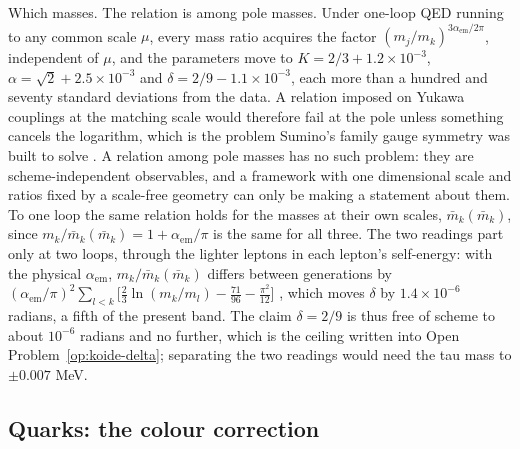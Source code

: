 Which masses. The relation is among pole masses. Under one-loop QED running to any common scale
$\mu$, every mass ratio acquires the factor $(m_j/m_k)^{3\alpha_{\mathrm{em}}/2\pi}$,
independent of $\mu$, and the parameters move to $K = 2/3 + 1.2\times10^{-3}$, $\alpha = \sqrt2
+ 2.5\times10^{-3}$ and $\delta = 2/9 - 1.1\times10^{-3}$, each more than a hundred and seventy
standard deviations from the data. A relation imposed on Yukawa couplings at the matching scale
would therefore fail at the pole unless something cancels the logarithm, which is the problem
Sumino's family gauge symmetry was built to solve \autocite{sumino2009family,sumino2009origin}.
A relation among pole masses has no such problem: they are scheme-independent observables, and a
framework with one dimensional scale and ratios fixed by a scale-free geometry can only be
making a statement about them. To one loop the same relation holds for the masses at their own
scales, $\bar m_k(\bar m_k)$, since $m_k/\bar m_k(\bar m_k) = 1 + \alpha_{\mathrm{em}}/\pi$ is
the same for all three. The two readings part only at two loops, through the lighter leptons in
each lepton's self-energy: with the physical $\alpha_{\mathrm{em}}$, $m_k/\bar m_k(\bar m_k)$
differs between generations by $(\alpha_{\mathrm{em}}/\pi)^2\sum_{l<k}\bigl[\tfrac23\ln(m_k/m_l)
- \tfrac{71}{96} - \tfrac{\pi^2}{12}\bigr]$ \autocite{melnikovvanritbergen2000threeloop}, which
moves $\delta$ by $1.4\times10^{-6}$ radians, a fifth of the present band. The claim $\delta =
2/9$ is thus free of scheme to about $10^{-6}$ radians and no further, which is the ceiling
written into Open Problem~\ref{op:koide-delta}; separating the two readings would need the tau
mass to $\pm0.007$ MeV.

\subsection{Quarks: the colour correction}

